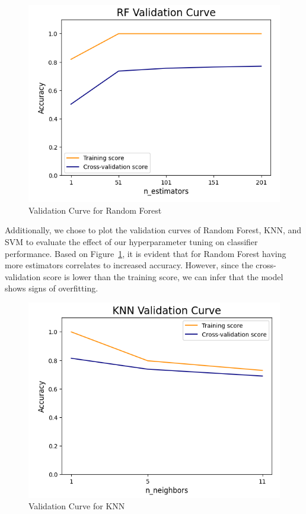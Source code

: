 \documentclass{article}
\begin{document}
\begin{figure}[ht]
\vskip 0.2in
\begin{center}
\centerline{\includegraphics[width=\columnwidth]{image5}}
\caption{Validation Curve for Random Forest}
\label{validation-curve}
\end{center}
\vskip -0.2in
\end{figure}

Additionally, we chose to plot the validation curves of Random Forest, KNN, and SVM to evaluate the effect of our hyperparameter tuning on classifier performance. Based on Figure~\ref{validation-curve}, it is evident that for Random Forest having more estimators correlates to increased accuracy. However, since the cross-validation score is lower than the training score, we can infer that the model shows signs of overfitting.

\begin{figure}[ht]
\vskip 0.2in
\begin{center}
\centerline{\includegraphics[width=\columnwidth]{image6}}
\caption{Validation Curve for KNN}
\label{knn-curve}
\end{center}
\vskip -0.2in
\end{figure}
\end{document}
